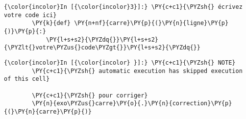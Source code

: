     \begin{Verbatim}[commandchars=\\\{\}]
{\color{incolor}In [{\color{incolor}3}]:} \PY{c+c1}{\PYZsh{} écrivez votre code ici}
        \PY{k}{def} \PY{n+nf}{carre}\PY{p}{(}\PY{n}{ligne}\PY{p}{)}\PY{p}{:}
            \PY{l+s+s2}{\PYZdq{}}\PY{l+s+s2}{\PYZlt{}votre\PYZus{}code\PYZgt{}}\PY{l+s+s2}{\PYZdq{}}
\end{Verbatim}


    \begin{Verbatim}[commandchars=\\\{\}]
{\color{incolor}In [{\color{incolor} }]:} \PY{c+c1}{\PYZsh{} NOTE}
        \PY{c+c1}{\PYZsh{} automatic execution has skipped execution of this cell}
        
        \PY{c+c1}{\PYZsh{} pour corriger}
        \PY{n}{exo\PYZus{}carre}\PY{o}{.}\PY{n}{correction}\PY{p}{(}\PY{n}{carre}\PY{p}{)}
\end{Verbatim}



    
    
    
